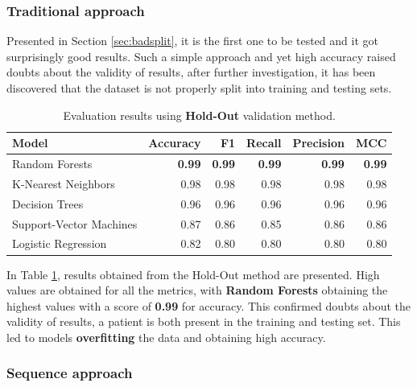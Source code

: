             \subsubsection{Traditional approach}
                
                Presented in Section \ref{sec:badsplit}, it is the first one to be tested and it got surprisingly good results. Such a simple approach and yet high accuracy raised doubts about the validity of results, after further investigation, it has been discovered that the dataset is not properly split into training and testing sets. 
            
                \begin{table}[htbp]
                    \centering
                    \begin{tabular}{lrrrrr}
                        \toprule
                        \textbf{Model} & \textbf{Accuracy} & \textbf{F1} & \textbf{Recall} & \textbf{Precision} & \textbf{MCC} \\
                        \midrule
                        Random Forests & \textbf{0.99} & \textbf{0.99} & \textbf{0.99} & \textbf{0.99} & \textbf{0.99} \\
                        K-Nearest Neighbors & 0.98 & 0.98 & 0.98 & 0.98 & 0.98 \\
                        Decision Trees & 0.96 & 0.96 & 0.96 & 0.96 & 0.96 \\
                        Support-Vector Machines & 0.87 & 0.86 & 0.85 & 0.86 & 0.86 \\
                        Logistic Regression & 0.82 & 0.80 & 0.80 & 0.80 & 0.80 \\
                        \bottomrule
                    \end{tabular}
                    \caption{Evaluation results using \textbf{Hold-Out} validation method.}
                    \label{tab:wrong_approach_holdout}
                \end{table}

                In Table \ref{tab:wrong_approach_holdout}, results obtained from the Hold-Out method are presented. High values are obtained for all the metrics, with \textbf{Random Forests} obtaining the highest values with a score of \textbf{0.99} for accuracy. This confirmed doubts about the validity of results, a patient is both present in the training and testing set. This led to models \textbf{overfitting} the data and obtaining high accuracy.

            \subsubsection{Sequence approach}

